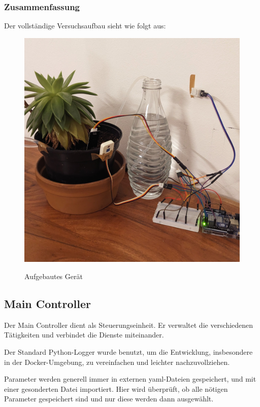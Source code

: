 \subsubsection{Zusammenfassung}

Der vollständige Versuchsaufbau sieht wie folgt aus:

\begin{figure}[H]
\centering
\includegraphics[width=\textwidth]{images/versuchsaufbau.jpg}
\caption{Aufgebautes Gerät}\cite{rainpoint_smart_timer}
\label{fig:rainpointDiagram}
\end{figure}

\subsection{Main Controller}
Der Main Controller dient als Steuerungseinheit. Er verwaltet die verschiedenen Tätigkeiten und verbindet die Dienste miteinander.

Der Standard Python-Logger wurde benutzt, um die Entwicklung, insbesondere in der Docker-Umgebung, zu vereinfachen und leichter nachzuvollziehen.

Parameter werden generell immer in externen yaml-Dateien gespeichert, und mit einer gesonderten Datei importiert. Hier wird überprüft, ob alle nötigen Parameter gespeichert sind und nur diese werden dann ausgewählt.

